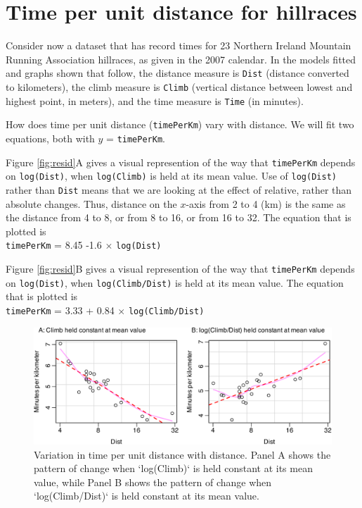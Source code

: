 \documentclass[
  10pt,
  b5paper]{book}
\begin{document}
\hypertarget{time-per-unit-distance-for-hillraces}{%
\section{Time per unit distance for hillraces}\label{time-per-unit-distance-for-hillraces}}

Consider now a dataset that has record times for 23 Northern Ireland
Mountain Running Association hillraces, as given in the 2007
calendar. In the models fitted and graphs shown that follow,
the distance measure is \texttt{Dist} (distance converted to kilometers),
the climb measure is \texttt{Climb} (vertical distance between lowest
and highest point, in meters), and the time measure is \texttt{Time}
(in minutes).

How does time per unit distance (\texttt{timePerKm}) vary with distance.
We will fit two equations, both with \(y\) = \texttt{timePerKm}.

Figure \ref{fig:resid}A gives a visual represention of the
way that \texttt{timePerKm} depends on \texttt{log(Dist)}, when \texttt{log(Climb)}
is held at its mean value. Use of \texttt{log(Dist)} rather than
\texttt{Dist} means that we are looking at the effect of relative,
rather than absolute changes. Thus, distance on the \(x\)-axis
from 2 to 4 (km) is the same as the distance from 4 to 8, or
from 8 to 16, or from 16 to 32. The equation that is plotted
is\\
\texttt{timePerKm} = 8.45 -1.6 \(\times\) \texttt{log(Dist)}

Figure \ref{fig:resid}B gives a visual represention of the
way that \texttt{timePerKm} depends on \texttt{log(Dist)}, when \texttt{log(Climb/Dist)}
is held at its mean value. The equation that is plotted
is\\
\texttt{timePerKm} = 3.33 + 0.84 \(\times\) \texttt{log(Climb/Dist)}

\begin{figure}[H]

{\centering \includegraphics[width=1\linewidth]{08-observational_files/figure-latex/partial-1} 

}

\caption{Variation in time per unit distance with distance.  Panel A
shows the pattern of change when `log(Climb)` is held constant at its 
mean value, while Panel B shows the pattern of change when 
`log(Climb/Dist)` is held constant at its mean value.}\label{fig:partial}
\end{figure}
\end{document}
